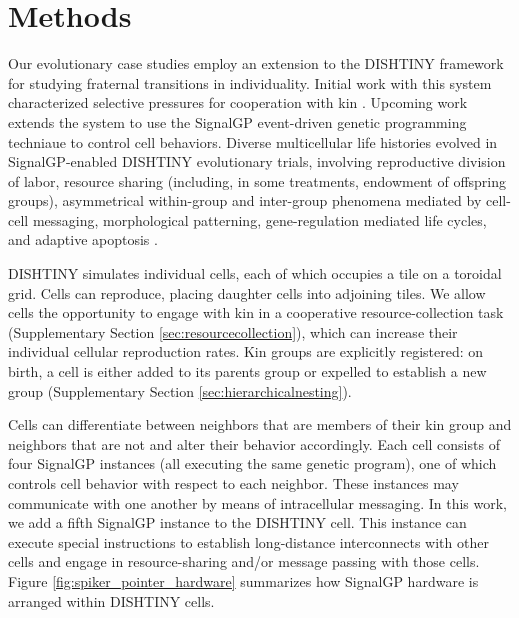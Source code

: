 \section{Methods}

Our evolutionary case studies employ an extension to the DISHTINY framework for studying fraternal transitions in individuality.
Initial work with this system characterized selective pressures for cooperation with kin \citep{moreno2019toward}.
Upcoming work extends the system to use the SignalGP event-driven genetic programming techniaue \citep{lalejini2018evolving} to control cell behaviors.
Diverse multicellular life histories evolved in SignalGP-enabled DISHTINY evolutionary trials, involving reproductive division of labor, resource sharing (including, in some treatments, endowment of offspring  groups), asymmetrical within-group and inter-group phenomena mediated by cell-cell messaging, morphological patterning, gene-regulation mediated life cycles, and adaptive apoptosis \citep{TODOcitedishtinygp}.

DISHTINY simulates individual cells, each of which occupies a tile on a toroidal grid.
Cells can reproduce, placing daughter cells into adjoining tiles.
We allow cells the opportunity to engage with kin in a cooperative resource-collection task (Supplementary Section \ref{sec:resourcecollection}), which can increase their individual cellular reproduction rates.
Kin groups are explicitly registered: on birth, a cell is either added to its parents group or expelled to establish a new group (Supplementary Section \ref{sec:hierarchicalnesting}).

Cells can differentiate between neighbors that are members of their kin group and neighbors that are not and alter their behavior accordingly.
Each cell consists of four SignalGP instances (all executing the same genetic program), one of which controls cell behavior with respect to each neighbor.
These instances may communicate with one another by means of intracellular messaging.
In this work, we add a fifth SignalGP instance to the DISHTINY cell.
This instance can execute special instructions to establish long-distance interconnects with other cells and engage in resource-sharing and/or message passing with those cells.
Figure \ref{fig:spiker_pointer_hardware} summarizes how SignalGP hardware is arranged within DISHTINY cells.

